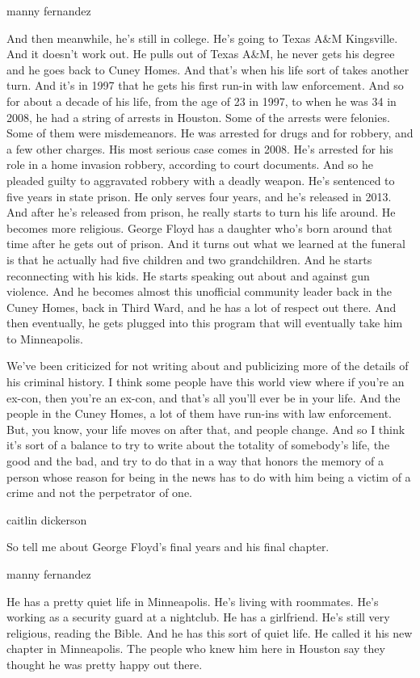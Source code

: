 manny fernandez

And then meanwhile, he's still in college. He's going to Texas A\&M
Kingsville. And it doesn't work out. He pulls out of Texas A\&M, he
never gets his degree and he goes back to Cuney Homes. And that's when
his life sort of takes another turn. And it's in 1997 that he gets his
first run-in with law enforcement. And so for about a decade of his
life, from the age of 23 in 1997, to when he was 34 in 2008, he had a
string of arrests in Houston. Some of the arrests were felonies. Some of
them were misdemeanors. He was arrested for drugs and for robbery, and a
few other charges. His most serious case comes in 2008. He's arrested
for his role in a home invasion robbery, according to court documents.
And so he pleaded guilty to aggravated robbery with a deadly weapon.
He's sentenced to five years in state prison. He only serves four years,
and he's released in 2013. And after he's released from prison, he
really starts to turn his life around. He becomes more religious. George
Floyd has a daughter who's born around that time after he gets out of
prison. And it turns out what we learned at the funeral is that he
actually had five children and two grandchildren. And he starts
reconnecting with his kids. He starts speaking out about and against gun
violence. And he becomes almost this unofficial community leader back in
the Cuney Homes, back in Third Ward, and he has a lot of respect out
there. And then eventually, he gets plugged into this program that will
eventually take him to Minneapolis.

We've been criticized for not writing about and publicizing more of the
details of his criminal history. I think some people have this world
view where if you're an ex-con, then you're an ex-con, and that's all
you'll ever be in your life. And the people in the Cuney Homes, a lot of
them have run-ins with law enforcement. But, you know, your life moves
on after that, and people change. And so I think it's sort of a balance
to try to write about the totality of somebody's life, the good and the
bad, and try to do that in a way that honors the memory of a person
whose reason for being in the news has to do with him being a victim of
a crime and not the perpetrator of one.

caitlin dickerson

So tell me about George Floyd's final years and his final chapter.

manny fernandez

He has a pretty quiet life in Minneapolis. He's living with roommates.
He's working as a security guard at a nightclub. He has a girlfriend.
He's still very religious, reading the Bible. And he has this sort of
quiet life. He called it his new chapter in Minneapolis. The people who
knew him here in Houston say they thought he was pretty happy out there.

